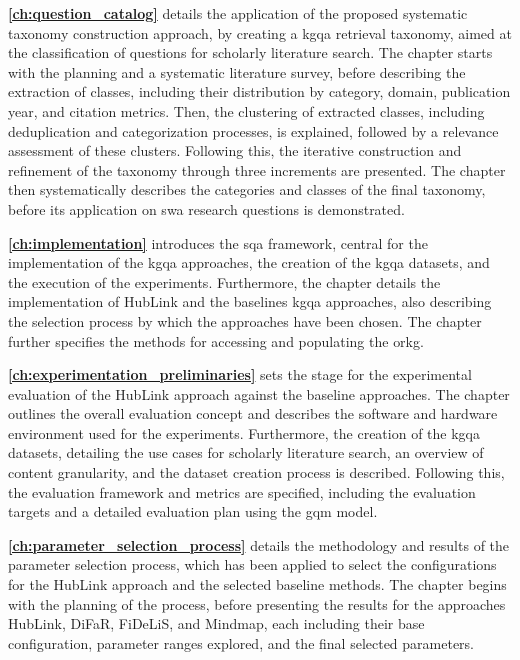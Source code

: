 \textbf{\autoref{ch:question_catalog}} details the application of the proposed systematic taxonomy construction approach, by creating a \gls{kgqa} retrieval taxonomy, aimed at the classification of questions for scholarly literature search. The chapter starts with the planning and a systematic literature survey, before describing the extraction of classes, including their distribution by category, domain, publication year, and citation metrics. Then, the clustering of extracted classes, including deduplication and categorization processes, is explained, followed by a relevance assessment of these clusters. Following this, the iterative construction and refinement of the taxonomy through three increments are presented. The chapter then systematically describes the categories and classes of the final taxonomy, before its application on \gls{swa} research questions is demonstrated. 

\textbf{\autoref{ch:implementation}} introduces the \gls{sqa} framework, central for the implementation of the \gls{kgqa} approaches, the creation of the \gls{kgqa} datasets, and the execution of the experiments. Furthermore, the chapter details the implementation of HubLink and the baselines \gls{kgqa} approaches, also describing the selection process by which the approaches have been chosen. The chapter further specifies the methods for accessing and populating the \gls{orkg}.

\textbf{\autoref{ch:experimentation_preliminaries}} sets the stage for the experimental evaluation of the HubLink approach against the baseline approaches. The chapter outlines the overall evaluation concept and describes the software and hardware environment used for the experiments. Furthermore, the creation of the \gls{kgqa} datasets, detailing the use cases for scholarly literature search, an overview of content granularity, and the dataset creation process is described. Following this, the evaluation framework and metrics are specified, including the evaluation targets and a detailed evaluation plan using the \gls{gqm} model. 

\textbf{\autoref{ch:parameter_selection_process}} details the methodology and results of the parameter selection process, which has been applied to select the configurations for the HubLink approach and the selected baseline methods. The chapter begins with the planning of the process, before presenting the results for the approaches HubLink, DiFaR, FiDeLiS, and Mindmap, each including their base configuration, parameter ranges explored, and the final selected parameters.

